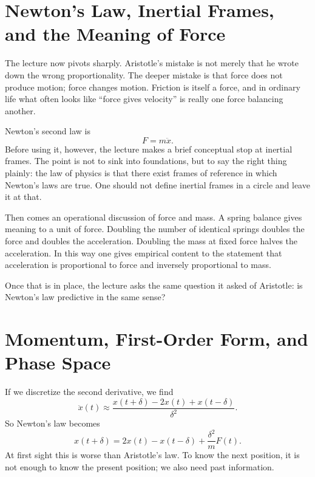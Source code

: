 \section{Newton's Law, Inertial Frames, and the Meaning of Force}

The lecture now pivots sharply. Aristotle's mistake is not merely that he wrote down the wrong proportionality. The deeper mistake is that force does not produce motion; force changes motion. Friction is itself a force, and in ordinary life what often looks like ``force gives velocity'' is really one force balancing another.

Newton's second law is
\begin{equation}
F=m\ddot x.
\end{equation}
Before using it, however, the lecture makes a brief conceptual stop at inertial frames. The point is not to sink into foundations, but to say the right thing plainly: the law of physics is that there exist frames of reference in which Newton's laws are true. One should not define inertial frames in a circle and leave it at that.

Then comes an operational discussion of force and mass. A spring balance gives meaning to a unit of force. Doubling the number of identical springs doubles the force and doubles the acceleration. Doubling the mass at fixed force halves the acceleration. In this way one gives empirical content to the statement that acceleration is proportional to force and inversely proportional to mass.

Once that is in place, the lecture asks the same question it asked of Aristotle: is Newton's law predictive in the same sense?

\section{Momentum, First-Order Form, and Phase Space}

If we discretize the second derivative, we find
\begin{equation}
\ddot x(t)\approx \frac{x(t+\delta)-2x(t)+x(t-\delta)}{\delta^2}.
\end{equation}
So Newton's law becomes
\begin{equation}
x(t+\delta)=2x(t)-x(t-\delta)+\frac{\delta^2}{m}F(t).
\end{equation}
At first sight this is worse than Aristotle's law. To know the next position, it is not enough to know the present position; we also need past information.

